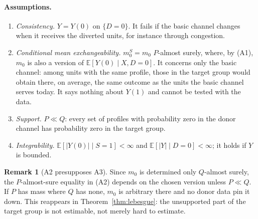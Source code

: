 \documentclass[twoside,11pt]{article}
\newcommand{\E}{\mathbb{E}}
\theoremstyle{plain}
\theoremstyle{definition}
\newtheorem{remark}{Remark}
\begin{document}
\paragraph{Assumptions.}
\begin{enumerate}[label=(A\arabic*)]
  \item \emph{Consistency.} $Y=Y(0)$ on $\{D=0\}$. It fails if the basic channel changes when it receives the diverted units, for instance through congestion.
  \item \emph{Conditional mean exchangeability.} $m_0^S=m_0$ $P$-almost surely, where, by (A1), $m_0$ is also a version of $\E[Y(0)\mid X,D=0]$. It concerns only the basic channel: among units with the same profile, those in the target group would obtain there, on average, the same outcome as the units the basic channel serves today. It says nothing about $Y(1)$ and cannot be tested with the data.
  \item \emph{Support.} $P\ll Q$: every set of profiles with probability zero in the donor channel has probability zero in the target group.
  \item \emph{Integrability.} $\E[|Y(0)|\mid S=1]<\infty$ and $\E[|Y|\mid D=0]<\infty$; it holds if $Y$ is bounded.
\end{enumerate}

\begin{remark}[A2 presupposes A3]\label{rem:a2a3}
Since $m_0$ is determined only $Q$-almost surely, the $P$-almost-sure equality in (A2) depends on the chosen version unless $P\ll Q$. If $P$ has mass where $Q$ has none, $m_0$ is arbitrary there and no donor data pin it down. This reappears in Theorem~\ref{thm:lebesgue}: the unsupported part of the target group is not estimable, not merely hard to estimate.
\end{remark}
\end{document}

